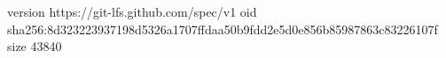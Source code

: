 version https://git-lfs.github.com/spec/v1
oid sha256:8d323223937198d5326a1707ffdaa50b9fdd2e5d0e856b85987863c83226107f
size 43840
